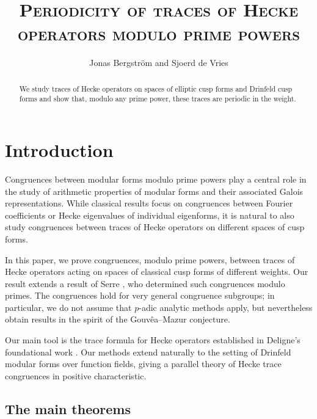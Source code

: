 \documentclass[10pt]{article}
\title{\textsc{Periodicity of traces of Hecke operators modulo prime powers}}
\author{Jonas Bergstr\"om and Sjoerd de Vries}
\date{}
\theoremstyle{definition}
\renewcommand{\:}{\colon}
\begin{document}
\maketitle
\begin{abstract}
    \noindent
   We study traces of Hecke operators on spaces of elliptic cusp forms and Drinfeld cusp forms and show that, modulo any prime power, these traces are periodic in the weight. 
\end{abstract}

\tableofcontents

\section{Introduction}
Congruences between modular forms modulo prime powers play a central role in the study of arithmetic properties of modular forms and their associated Galois representations. While classical results focus on congruences between Fourier coefficients or Hecke eigenvalues of individual eigenforms, it is natural to also study congruences between traces of Hecke operators on different spaces of cusp forms. 

In this paper, we prove congruences, modulo prime powers, between traces of Hecke operators acting on spaces of classical cusp forms of different weights. 
Our result extends a result of Serre \cite{serreletter}, who determined such congruences modulo primes. 
The congruences hold for very general congruence subgroups; in particular, we do not assume that $p$-adic analytic methods apply, but nevertheless obtain results in the spirit of the Gouv\^ea--Mazur conjecture.

Our main tool is the trace formula for Hecke operators established in Deligne’s foundational work \cite{Deligne}. Our methods extend naturally to the setting of Drinfeld modular forms over function fields, giving a parallel theory of Hecke trace congruences in positive characteristic.

\subsection{The main theorems}
\end{document}
